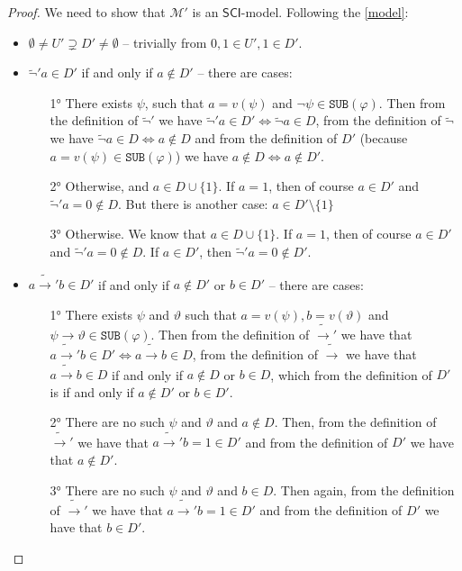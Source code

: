 \documentclass{article}
\theoremstyle{definition}
\newcommand*{\ra}{\rightarrow}
\newcommand*{\SUB}{\texttt{SUB}}
\newcommand{\SCI}{$\mathsf{SCI}$\xspace}
\begin{document}
\begin{proof}
    We need to show that $\mathcal{M'}$ is an \SCI-model. Following the
    \cref{model}:
    \begin{itemize}
        \item $\emptyset \not = U' \supsetneq D' \not = \emptyset$ -- trivially from $0, 1 \in U', 1 \in D'$.
        \item $\tilde{\lnot}'a \in D'$ if and only if $a \not \in D'$ -- there are cases:
              \begin{enumerate}
                  \item[1°] There exists $\psi$, such that $a = v(\psi)$ and $\lnot \psi \in \SUB(\varphi)$. Then from the definition of $\tilde{\lnot}'$ we have $\tilde{\lnot}'a \in D' \iff \tilde{\lnot}a \in D$, from the definition of $\tilde{\lnot}$ we have $\tilde{\lnot}a \in D \iff a \not \in D$ and from the definition of $D'$ (because $a=v(\psi) \in \SUB(\varphi)$) we have $a \not \in D \iff a \not \in D'$.
                  \item[2°] Otherwise, and $a \in D \cup \{1\}$. If $a = 1$, then of course $a \in D'$ and $\tilde{\lnot}'a = 0 \not \in D$. But there is another case: $a \in D' \setminus \{1\}$
                  \item[3°] Otherwise. We know that $a \in D \cup \{1\}$. If $a = 1$, then of course $a \in D'$ and $\tilde{\lnot}'a = 0 \not \in D$. If $a \in D'$, then $\tilde{\lnot}'a = 0 \not \in D'$.
              \end{enumerate}
        \item $a \tilde{\ra}'b \in D'$ if and only if $a \not \in D'$ or $b \in D'$ -- there are cases:
              \begin{enumerate}
                  \item[1°] There exists $\psi$ and $\vartheta$ such that $a = v(\psi), b=v(\vartheta)$ and $\psi \ra \vartheta \in \SUB(\varphi)$. Then from the definition of $\tilde{\ra}'$ we have that $a \tilde{\ra}'b \in D' \iff a \tilde{\ra} b \in D$, from the definition of $\tilde{\ra}$ we have that $a \tilde{\ra} b \in D$ if and only if $a \not \in D$ or $b \in D$, which from the definition of $D'$ is if and only if $a \not \in D'$ or $b \in D'$.
                  \item[2°] There are no such $\psi$ and $\vartheta$ and $a \not \in D$. Then, from the definition of $\tilde{\ra}'$ we have that $a \tilde{\ra}' b = 1 \in D'$ and from the definition of $D'$ we have that $a \not \in D'$.
                  \item[3°] There are no such $\psi$ and $\vartheta$ and $b \in D$. Then again, from the definition of $\tilde{\ra}'$ we have that $a \tilde{\ra}' b = 1 \in D'$ and from the definition of $D'$ we have that $b \in D'$.
              \end{enumerate}
    \end{itemize}
\end{proof}
\end{document}
